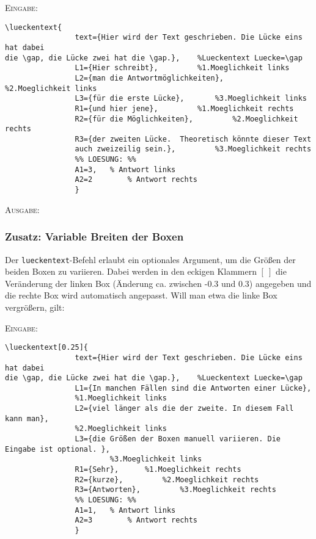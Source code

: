 \documentclass[a4paper,12pt]{article}
\begin{document}
\textsc{Eingabe:}
\begin{verbatim}
\lueckentext{
				text={Hier wird der Text geschrieben. Die Lücke eins hat dabei
die \gap, die Lücke zwei hat die \gap.}, 	%Lueckentext Luecke=\gap
				L1={Hier schreibt}, 		%1.Moeglichkeit links  
				L2={man die Antwortmöglichkeiten}, 		%2.Moeglichkeit links
				L3={für die erste Lücke}, 		%3.Moeglichkeit links
				R1={und hier jene}, 		%1.Moeglichkeit rechts 
				R2={für die Möglichkeiten}, 		%2.Moeglichkeit rechts
				R3={der zweiten Lücke.  Theoretisch könnte dieser Text 
				auch zweizeilig sein.}, 		%3.Moeglichkeit rechts
				%% LOESUNG: %%
				A1=3,   % Antwort links
				A2=2		% Antwort rechts
				}			
\end{verbatim}

\textsc{Ausgabe:}


\subsubsection{Zusatz: Variable Breiten der Boxen}

Der \texttt{lueckentext}-Befehl erlaubt ein optionales Argument, um die Größen der beiden Boxen zu variieren. Dabei werden in den eckigen Klammern $[~]$ die Veränderung der linken Box (Änderung ca. zwischen -0.3 und 0.3) angegeben und die rechte Box wird automatisch angepasst. Will man etwa die linke Box vergrößern, gilt:\leer  

\textsc{Eingabe:}

\begin{verbatim}
\lueckentext[0.25]{
				text={Hier wird der Text geschrieben. Die Lücke eins hat dabei
die \gap, die Lücke zwei hat die \gap.}, 	%Lueckentext Luecke=\gap
				L1={In manchen Fällen sind die Antworten einer Lücke}, 		
				%1.Moeglichkeit links  
				L2={viel länger als die der zweite. In diesem Fall kann man}, 		
				%2.Moeglichkeit links
				L3={die Größen der Boxen manuell variieren. Die Eingabe ist optional. }, 
						%3.Moeglichkeit links
				R1={Sehr}, 		%1.Moeglichkeit rechts 
				R2={kurze}, 		%2.Moeglichkeit rechts
				R3={Antworten}, 		%3.Moeglichkeit rechts
				%% LOESUNG: %%
				A1=1,   % Antwort links
				A2=3		% Antwort rechts 
				}
\end{verbatim}
\end{document}
